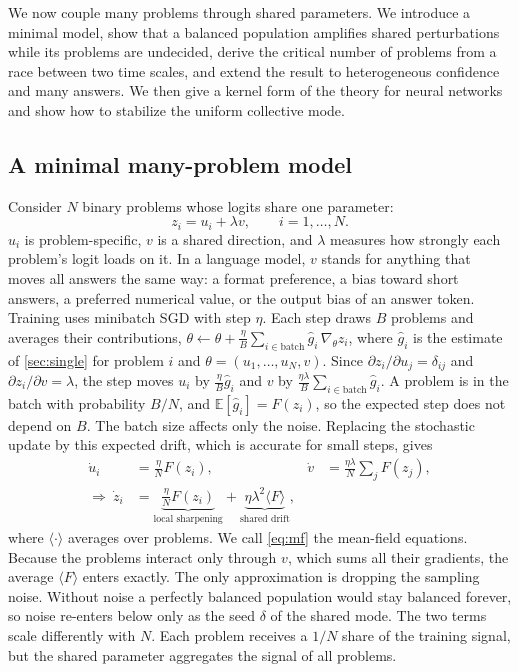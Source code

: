 We now couple many problems through shared parameters. We introduce a minimal model, show that a balanced population amplifies shared perturbations while its problems are undecided, derive the critical number of problems from a race between two time scales, and extend the result to heterogeneous confidence and many answers. We then give a kernel form of the theory for neural networks and show how to stabilize the uniform collective mode.

\subsection{A minimal many-problem model}
Consider $N$ binary problems whose logits share one parameter:
\begin{equation}
  z_i=u_i+\lambda v,\qquad i=1,\dots,N.
  \label{eq:model}
\end{equation}
$u_i$ is problem-specific, $v$ is a shared direction, and $\lambda$ measures how strongly each problem's logit loads on it.
In a language model, $v$ stands for anything that moves all answers the same way: a format preference, a bias toward short answers, a preferred numerical value, or the output bias of an answer token.
Training uses minibatch SGD with step $\eta$. Each step draws $B$ problems and averages their contributions, $\theta\leftarrow\theta+\frac{\eta}{B}\sum_{i\in\text{batch}}\hat g_i\,\nabla_\theta z_i$, where $\hat g_i$ is the estimate of \cref{sec:single} for problem $i$ and $\theta=(u_1,\dots,u_N,v)$. Since $\partial z_i/\partial u_j=\delta_{ij}$ and $\partial z_i/\partial v=\lambda$, the step moves $u_i$ by $\frac{\eta}{B}\hat g_i$ and $v$ by $\frac{\eta\lambda}{B}\sum_{i\in\text{batch}}\hat g_i$.
A problem is in the batch with probability $B/N$, and $\mathbb E[\hat g_i]=F(z_i)$, so the expected step does not depend on $B$. The batch size affects only the noise.
Replacing the stochastic update by this expected drift, which is accurate for small steps, gives
\begin{align}
  \dot u_i&=\tfrac{\eta}{N}F(z_i), &
  \dot v&=\tfrac{\eta\lambda}{N}\textstyle\sum_jF(z_j),\nonumber\\
  \Rightarrow\ \dot z_i&=\underbrace{\tfrac{\eta}{N}F(z_i)}_{\text{local sharpening}}+\underbrace{\eta\lambda^2\langle F\rangle}_{\text{shared drift}},
  \label{eq:mf}
\end{align}
where $\langle\cdot\rangle$ averages over problems.
We call \cref{eq:mf} the mean-field equations. Because the problems interact only through $v$, which sums all their gradients, the average $\langle F\rangle$ enters exactly. The only approximation is dropping the sampling noise. Without noise a perfectly balanced population would stay balanced forever, so noise re-enters below only as the seed $\delta$ of the shared mode.
The two terms scale differently with $N$. Each problem receives a $1/N$ share of the training signal, but the shared parameter aggregates the signal of all problems.

